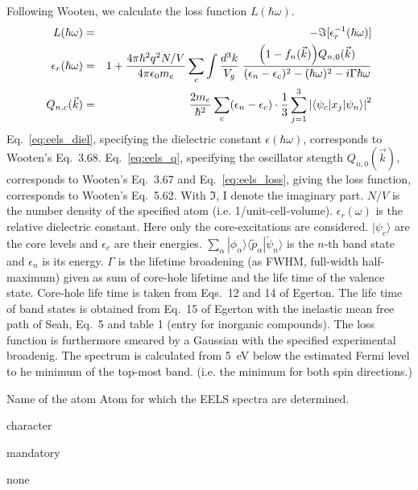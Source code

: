 \documentclass[final,12pt]{article}
\newcommand{\key}[1]{\hfill\break \makebox[1.5in][l]{\bf #1}\hfill\break}
\newcommand{\vdescr}[1]{\makebox[1in][l]{}\parbox[t]{110mm}{#1}\hfill\break}
\newcommand{\vformat}[1]{
\makebox[1in][l]{}\parbox[t]{110mm}{\makebox[1in][l]{Type:}\parbox[t]{2.7in}{#1}}
\hfill\break}
\newcommand{\vrules}[1]{
\makebox[1in][l]{}\parbox[t]{110mm}{\makebox[1in][l]{Rules:}\parbox[t]{2.7in}{#1}}
\hfill\break}
\newcommand{\vdefault}[1]{
\makebox[1in][l]{}\parbox[t]{110mm}
{\makebox[1in][l]{Default:}\parbox[t]{2.7in}{#1}}
\hfill\break}
\newcommand{\mbax}[1]{#1}
\begin{document}
Following Wooten\cite{wooten72_book}, we calculate
 the loss function $L(\hbar\omega)$.
  \begin{eqnarray}
  L(\hbar\omega)&=&-\Im[\epsilon^{-1}_r(\hbar\omega)]
\label{eq:eels_loss}
  \\
    \epsilon_r(\hbar\omega)&=&
1+\frac{4\pi\hbar^2 q^2 N/V}{4\pi\epsilon_0m_e}
\sum_c \int \frac{d^3k}{V_g}\;\frac{\Bigl(1-f_n(\vec{k})\Bigr)Q_{n,0}(\vec{k})}
{(\epsilon_{n}-\epsilon_{c})^2-(\hbar\omega)^2-i\Gamma\hbar\omega}
\label{eq:eels_diel}
\\
Q_{n,c}(\vec{k})&=&\frac{2m_e}{\hbar^2}\sum_c(\epsilon_n-\epsilon_c)
\cdot\frac{1}{3}\sum_{j=1}^3\left|\langle\psi_c|x_j|\psi_n\rangle\right|^2
\label{eq:eels_q}
  \end{eqnarray}
Eq.~\ref{eq:eels_diel}, specifying the dielectric constant
$\epsilon(\hbar\omega)$, corresponds to Wooten's Eq.~3.68.
Eq.~\ref{eq:eels_q}, specifying the oscillator stength
$Q_{n,0}(\vec{k})$, corresponds to Wooten's Eq.~3.67 and
Eq.~\ref{eq:eels_loss}, giving the loss function, corresponds to
Wooten's Eq.~5.62. With $\Im$, I denote the imaginary part. $N/V$ is
the number density of the specified atom
(i.e. 1/unit-cell-volume). $\epsilon_r(\omega)$ is the relative
dielectric constant. Here only the core-excitations are considered.
$|\psi_c\rangle$ are the core levels and $\epsilon_c$ are their
energies. $\sum_\alpha|\phi_\alpha\rangle
\langle\tilde{p}_\alpha|\tilde{\psi}_n\rangle$ is the $n$-th band
state and $\epsilon_n$ is its energy. $\Gamma$ is the lifetime
broadening (as FWHM, full-width half-maximum) given as sum of
core-hole lifetime and the life time of the valence state. Core-hole
life time is taken from Eqs.~12 and 14 of
Egerton\cite{egerton07_ultramicroscopy107_565}. The life time of band
states is obtained from Eq.~15 of Egerton
\cite{egerton07_ultramicroscopy107_565} with the inelastic mean free
path of Seah\cite{seah79_surfinterfaceanal1_2}, Eq.~5 and table 1
(entry for inorganic compounds). The loss function is furthermore
smeared by a Gaussian with the specified experimental broadenig.  The
spectrum is calculated from 5~eV below the estimated Fermi level to he
minimum of the top-most band. (i.e. the minimum for both spin
directions.)

\mbax{\key{ATOM} 
\vdescr{Name of the atom Atom for which the EELS spectra are determined.}
\vformat{character} 
\vrules{mandatory}
\vdefault{none}}
\end{document}
